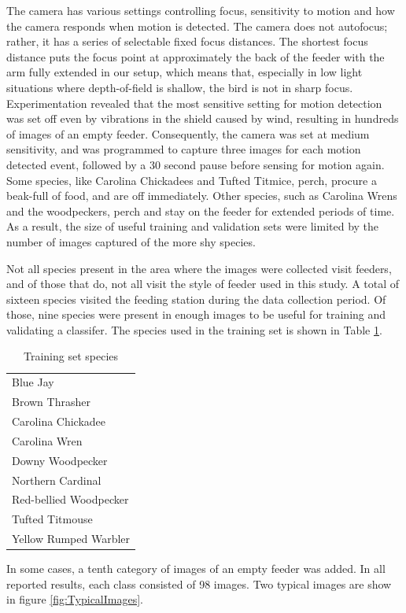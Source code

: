 \documentclass[11pt,twocolumn]{article}
\begin{document}
The camera has various settings controlling focus,  sensitivity to motion
and how the camera responds when motion is detected. The camera does not
autofocus; rather, it has a series of selectable fixed focus distances.
The shortest focus distance puts the focus point at approximately the
back of the feeder with the arm fully extended in our setup, which means
that, especially in low light situations where depth-of-field is shallow,
the bird is not in sharp focus. Experimentation revealed that the most
sensitive setting for motion detection was set off even by vibrations
in the shield caused by wind, resulting in hundreds of images of an
empty feeder. Consequently, the camera was set at medium sensitivity,
and was programmed to capture three images for each motion detected
event, followed by a 30 second pause before sensing for motion again.
Some species, like Carolina Chickadees and Tufted Titmice, perch,
procure a beak-full of food, and are off immediately. Other species,
such as Carolina Wrens and the woodpeckers, perch and stay on the
feeder for extended periods of time. As a result, the size of useful
training and validation sets were limited by the number of images
captured of the more shy species.

Not all species present in the area where the images were collected
visit feeders, and of those that do, not all visit the style of
feeder used in this study. A total of sixteen species visited
the feeding station during the data collection period. Of those,
nine species were present in enough images to be useful for
training and validating a classifer. The species used in the training
set is shown in Table \ref{table:species}.
\begin{table}[h]
  \caption{Training set species}
  \label{table:species}
  \begin{center}
    \begin{tabular}{l}
      \hline
      Blue Jay \\ 
      Brown Thrasher \\ 
      Carolina Chickadee \\ 
      Carolina Wren \\ 
      Downy Woodpecker  \\ 
      Northern Cardinal \\ 
      Red-bellied Woodpecker \\ 
      Tufted Titmouse \\ 
      Yellow Rumped Warbler \\ \hline
    \end{tabular}
  \end{center}
\end{table}
In some cases, a tenth category of images of an empty feeder
was added. In all reported results, each class consisted of 98 images.
Two typical images are show in figure \ref{fig:TypicalImages}.
\end{document}
